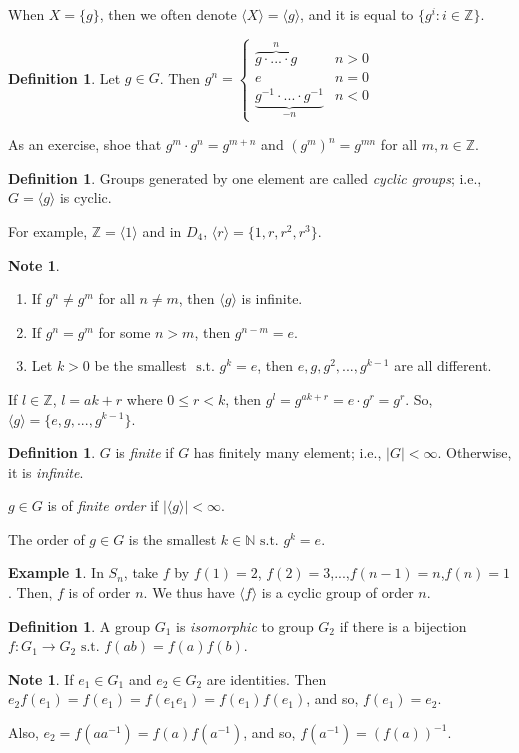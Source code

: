 \documentclass{amsart}
\theoremstyle{definition}
\newtheorem{definition}[thm]{Definition}
\newtheorem{example}[thm]{Example}
\newtheorem{note}[thm]{Note}
\newcommand{\N}{\mathbb N}
\newcommand{\Z}{\mathbb Z}
\newcommand{\st}{\text{ s.t. }}
\begin{document}
When $X=\{g\}$, then we often denote $\langle X\rangle =\langle g\rangle$, and it is equal to $\{g^i:i\in\Z\}$.
\begin{definition}
	Let $g\in G$. Then $g^n=\begin{cases}
		\overbrace{g\cdot ...\cdot g}^n&n>0\\
		e&n=0\\
		\underbrace{g^{-1}\cdot ...\cdot g^{-1}}_{-n}&n<0
	\end{cases}$
\end{definition}
	As an exercise, shoe that $g^m\cdot g^n=g^{m+n}$ and $(g^{m})^n=g^{mn}$ for all $m,n\in\Z$.
\begin{definition}
	Groups generated by one element are called \emph{cyclic groups}; i.e., $G=\langle g\rangle$ is cyclic.
\end{definition}
For example, $\Z=\langle 1\rangle$ and in $D_4$, $\langle r\rangle =\{1,r,r^2,r^3\}$.
\begin{note}
	\begin{enumerate}
	\item If $g^n\not=g^m$ for all $n\not=m$, then $\langle g\rangle$ is infinite.
	\item If $g^n=g^m$ for some $n>m$, then $g^{n-m}=e$.
	\item Let $k>0$ be the smallest $\st g^k=e$, then $e, g, g^2, ..., g^{k-1}$ are all different.
	\end{enumerate}
If $l\in\Z$, $l=ak+r$ where $0\leq r<k$, then $g^l=g^{ak+r}=e\cdot g^r=g^r$. So, $\langle g\rangle =\{e,g,...,g^{k-1}\}$.
\end{note}
\begin{definition}
	$G$ is \emph{finite} if $G$ has finitely many element; i.e., $|G|<\infty$. Otherwise, it is \emph{infinite}.
	
	$g\in G$ is of \emph{finite order} if $|\langle g\rangle|<\infty$.
	
	The order of $g\in G$ is the smallest $k\in\N\st g^k=e$.
\end{definition}
\begin{example}
	In $S_n$, take $f$ by $f(1)=2$, $f(2)=3$,...,$f(n-1)=n$,$f(n)=1$. Then, $f$ is of order $n$. We thus have $\langle f\rangle$ is a cyclic group of order $n$.
\end{example}
\begin{definition}
	A group $G_1$ is \emph{isomorphic} to group $G_2$ if there is a bijection $f:G_1\to G_2\st f(ab)=f(a)f(b)$.	
\end{definition}
\begin{note}
If $e_1\in G_1$ and $e_2\in G_2$ are identities. Then $e_2f(e_1)=f(e_1)=f(e_1e_1)=f(e_1)f(e_1)$, and so, $f(e_1)=e_2$.

Also, $e_2=f(aa^{-1})=f(a)f(a^{-1})$, and so, $f(a^{-1})=(f(a))^{-1}$.	
\end{note}
\end{document}
